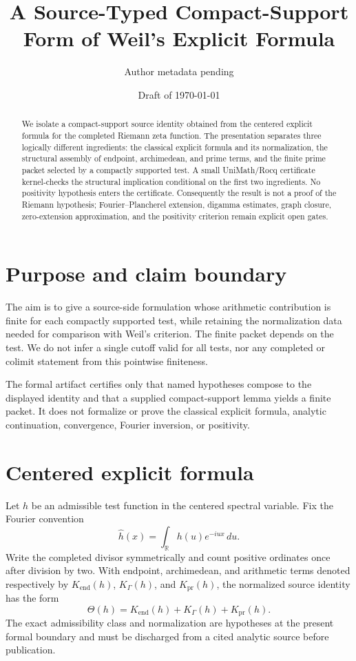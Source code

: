 \documentclass[11pt]{article}
\title{A Source-Typed Compact-Support Form of Weil's Explicit Formula}
\author{Author metadata pending}
\date{Draft of \today}
\newcommand{\R}{\mathbb R}
\begin{document}
\maketitle

\begin{abstract}
We isolate a compact-support source identity obtained from the centered explicit formula for the completed Riemann zeta function. The presentation separates three logically different ingredients: the classical explicit formula and its normalization, the structural assembly of endpoint, archimedean, and prime terms, and the finite prime packet selected by a compactly supported test. A small UniMath/Rocq certificate kernel-checks the structural implication conditional on the first two ingredients. No positivity hypothesis enters the certificate. Consequently the result is not a proof of the Riemann hypothesis; Fourier--Plancherel extension, digamma estimates, graph closure, zero-extension approximation, and the positivity criterion remain explicit open gates.
\end{abstract}

\section{Purpose and claim boundary}
The aim is to give a source-side formulation whose arithmetic contribution is finite for each compactly supported test, while retaining the normalization data needed for comparison with Weil's criterion. The finite packet depends on the test. We do not infer a single cutoff valid for all tests, nor any completed or colimit statement from this pointwise finiteness.

The formal artifact certifies only that named hypotheses compose to the displayed identity and that a supplied compact-support lemma yields a finite packet. It does not formalize or prove the classical explicit formula, analytic continuation, convergence, Fourier inversion, or positivity.

\section{Centered explicit formula}
Let $h$ be an admissible test function in the centered spectral variable. Fix the Fourier convention
\[
 \widehat h(x)=\int_{\R}h(u)e^{-iux}\,du.
\]
Write the completed divisor symmetrically and count positive ordinates once after division by two. With endpoint, archimedean, and arithmetic terms denoted respectively by $K_{\mathrm{end}}(h)$, $K_{\Gamma}(h)$, and $K_{\mathrm{pr}}(h)$, the normalized source identity has the form
\[
 \Theta(h)=K_{\mathrm{end}}(h)+K_{\Gamma}(h)+K_{\mathrm{pr}}(h).
\]
The exact admissibility class and normalization are hypotheses at the present formal boundary and must be discharged from a cited analytic source before publication.
\end{document}

